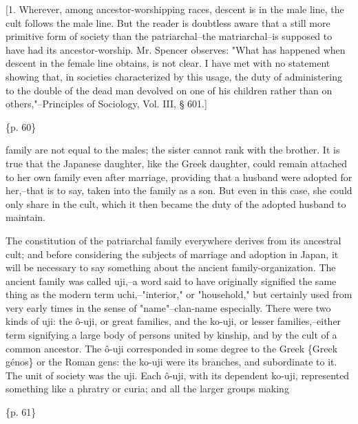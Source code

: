 [1. Wherever, among ancestor-worshipping races, descent is in the male line, the cult follows the male line. But the reader is doubtless aware that a still more primitive form of society than the patriarchal--the matriarchal--is supposed to have had its ancestor-worship. Mr. Spencer observes: "What has happened when descent in the female line obtains, is not clear. I have met with no statement showing that, in societies characterized by this usage, the duty of administering to the double of the dead man devolved on one of his children rather than on others,"--Principles of Sociology, Vol. III, § 601.]

\{p. 60\}

family are not equal to the males; the sister cannot rank with the brother. It is true that the Japanese daughter, like the Greek daughter, could remain attached to her own family even after marriage, providing that a husband were adopted for her,--that is to say, taken into the family as a son. But even in this case, she could only share in the cult, which it then became the duty of the adopted husband to maintain.



The constitution of the patriarchal family everywhere derives from its ancestral cult; and before considering the subjects of marriage and adoption in Japan, it will be necessary to say something about the ancient family-organization. The ancient family was called uji,--a word said to have originally signified the same thing as the modern term uchi,--"interior," or "household," but certainly used from very early times in the sense of "name"--clan-name especially. There were two kinds of uji: the ô-uji, or great families, and the ko-uji, or lesser families,--either term signifying a large body of persons united by kinship, and by the cult of a common ancestor. The ô-uji corresponded in some degree to the Greek \{Greek génos\} or the Roman gens: the ko-uji were its branches, and subordinate to it. The unit of society was the uji. Each ô-uji, with its dependent ko-uji, represented something like a phratry or curia; and all the larger groups making

\{p. 61\}

